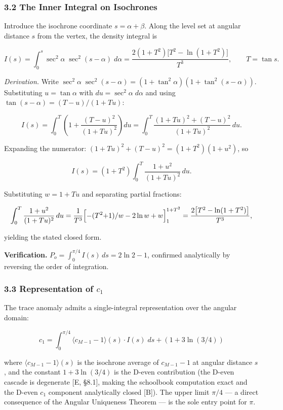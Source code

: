 \documentclass[
  11pt,
]{article}
\begin{document}
\subsubsection{3.2 The Inner Integral on
Isochrones}\label{the-inner-integral-on-isochrones}

Introduce the isochrone coordinate \(s = \alpha + \beta\). Along the level set
at angular distance \(s\) from the vertex, the density integral is

\[I(s) = \int_0^{s} \sec^2\!\alpha\;\sec^2(s - \alpha)\;d\alpha = \frac{2(1+T^2)\bigl[T^2 - \ln(1+T^2)\bigr]}{T^3}, \qquad T = \tan s.\]

\emph{Derivation.} Write
\(\sec^2\!\alpha\;\sec^2(s-\alpha) = (1 + \tan^2\!\alpha)(1 + \tan^2(s-\alpha))\).
Substituting \(u = \tan\alpha\) with \(du = \sec^2\!\alpha\;d\alpha\) and using
\(\tan(s-\alpha) = (T - u)/(1 + Tu)\):

\[I(s) = \int_0^{T} \left(1 + \frac{(T-u)^2}{(1+Tu)^2}\right) du = \int_0^T \frac{(1+Tu)^2 + (T-u)^2}{(1+Tu)^2}\,du.\]

Expanding the numerator: \((1+Tu)^2 + (T-u)^2 = (1 + T^2)(1 + u^2)\), so

\[I(s) = (1+T^2)\int_0^{T} \frac{1 + u^2}{(1+Tu)^2}\,du.\]

Substituting \(w = 1 + Tu\) and separating partial fractions:

\[\int_0^T \frac{1+u^2}{(1+Tu)^2}\,du = \frac{1}{T^3}\Bigl[-(T^2{+}1)/w - 2\ln w + w\Bigr]_1^{1+T^2} = \frac{2\bigl[T^2 - \ln(1+T^2)\bigr]}{T^3},\]

yielding the stated closed form.

\textbf{Verification.} \(P_o = \int_0^{\pi/4} I(s)\,ds = 2\ln 2 - 1\), confirmed
analytically by reversing the order of integration.

\subsubsection{\texorpdfstring{3.3 Representation of
\(c_1\)}{3.3 Representation of c\_1}}\label{representation-of-c_1}

The trace anomaly admits a single-integral representation over the angular
domain:

\[c_1 = \int_0^{\pi/4} \langle c_{M-1} - 1\rangle(s) \cdot I(s)\;ds + (1 + 3\ln(3/4))\]

where \(\langle c_{M-1} - 1\rangle(s)\) is the isochrone average of
\(c_{M-1} - 1\) at angular distance \(s\), and the constant \(1 + 3\ln(3/4)\) is
the D-even contribution (the D-even cascade is degenerate {[}E, §8.1{]}, making
the schoolbook computation exact and the D-even \(c_1\) component analytically
closed {[}B{]}). The upper limit \(\pi/4\) --- a direct consequence of the
Angular Uniqueness Theorem --- is the sole entry point for \(\pi\).
\end{document}
